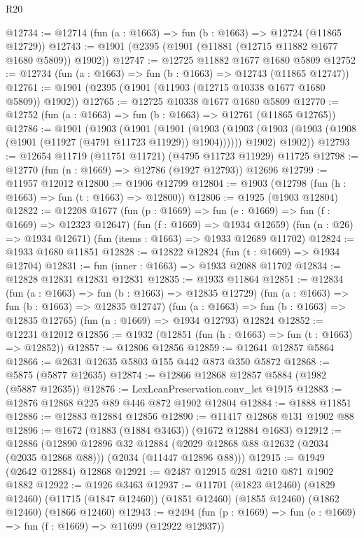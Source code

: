 \begin{lexlean}{R20}
\begin{coremodule}
@12734 := @12714 (fun (a : @1663) => fun (b : @1663) => @12724 (@11865 @12729))
@12743 := @1901 (@2395 (@1901 (@11881 (@12715 @11882 @1677 @1680 @5809)) @1902))
@12747 := @12725 @11882 @1677 @1680 @5809
@12752 := @12734 (fun (a : @1663) => fun (b : @1663) => @12743 (@11865 @12747))
@12761 := @1901 (@2395 (@1901 (@11903 (@12715 @10338 @1677 @1680 @5809)) @1902))
@12765 := @12725 @10338 @1677 @1680 @5809
@12770 := @12752 (fun (a : @1663) => fun (b : @1663) => @12761 (@11865 @12765))
@12786 := @1901
    (@1903
      (@1901
        (@1901
          (@1903 (@1903 (@1903 (@1903 (@1908 (@1901 (@11927 (@4791 @11723 @11929)) @1904))))))
          @1902)
        @1902))
@12793 := @12654 @11719 (@11751 @11721) (@4795 @11723 @11929) @11725
@12798 := @12770 (fun (n : @1669) => @12786 (@1927 @12793)) @12696
@12799 := @11957 @12012
@12800 := @1906 @12799
@12804 := @1903 (@12798 (fun (h : @1663) => fun (t : @1663) => @12800))
@12806 := @1925 (@1903 @12804)
@12822 := @12208
    @1677
    (fun (p : @1669) => fun (e : @1669) => fun (f : @1669) => @12323 @12647)
    (fun (f : @1669) => @1934 @12659)
    (fun (n : @26) => @1934 @12671)
    (fun (items : @1663) => @1933 @12689 @11702)
@12824 := @1933 @1680 @11851
@12828 := @12822 @12824 (fun (t : @1669) => @1934 @12704)
@12831 := fun (inner : @1663) => @1933 @2088 @11702
@12834 := @12828 @12831 @12831 @12831
@12835 := @1933 @11864
@12851 := @12834
    (fun (a : @1663) => fun (b : @1663) => @12835 @12729)
    (fun (a : @1663) => fun (b : @1663) => @12835 @12747)
    (fun (a : @1663) => fun (b : @1663) => @12835 @12765)
    (fun (n : @1669) => @1934 @12793)
    @12824
@12852 := @12231 @12012
@12856 := @1932 (@12851 (fun (h : @1663) => fun (t : @1663) => @12852))
@12857 := @12806 @12856
@12859 := @12641 @12857 @5864
@12866 := @2631 @12635 @5803 @155 @442 @873 @350 @5872
@12868 := @5875 (@5877 @12635)
@12874 := @12866 @12868 @12857 @5884 (@1982 (@5887 @12635))
@12876 := LexLeanPreservation.conv_let @1915
@12883 := @12876 @12868 @225 @89 @446 @872 @1902 @12804
@12884 := @1888 @11851
@12886 := @12883 @12884 @12856
@12890 := @11417 @12868 @131 @1902 @88
@12896 := @1672 (@1883 (@1884 @3463)) (@1672 @12884 @1683)
@12912 := @12886
    (@12890
      @12896
      @32
      @12884
      (@2029 @12868 @88 @12632 (@2034 (@2035 @12868 @88)))
      (@2034 (@11447 @12896 @88)))
@12915 := @1949 (@2642 @12884) @12868
@12921 := @2487 @12915 @281 @210 @871 @1902 @1882
@12922 := @1926 @3463
@12937 := @11701
    (@1823 @12460)
    (@1829 @12460)
    (@11715 (@1847 @12460))
    (@1851 @12460)
    (@1855 @12460)
    (@1862 @12460)
    (@1866 @12460)
@12943 := @2494 (fun (p : @1669) => fun (e : @1669) => fun (f : @1669) => @11699 (@12922 @12937))

\end{coremodule}
\end{lexlean}
